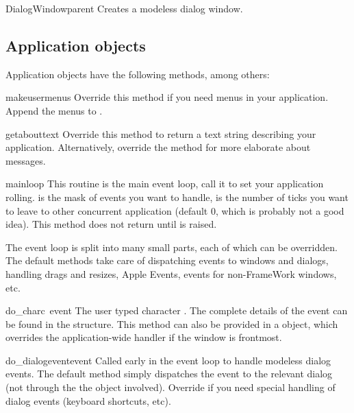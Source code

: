 \begin{funcdesc}{DialogWindow}{parent}
Creates a modeless dialog window.
\end{funcdesc}


\subsection{Application objects}
Application objects have the following methods, among others:

\renewcommand{\indexsubitem}{(Application method)}

\begin{funcdesc}{makeusermenus}{}
Override this method if you need menus in your application. Append the
menus to .
\end{funcdesc}

\begin{funcdesc}{getabouttext}{}
Override this method to return a text string describing your
application. Alternatively, override the  method for
more elaborate about messages.
\end{funcdesc}

\begin{funcdesc}{mainloop}{}
This routine is the main event loop, call it to set your application
rolling.  is the mask of events you want to handle,
 is the number of ticks you want to leave to other
concurrent application (default 0, which is probably not a good
idea). This method does not return until  is raised.

The event loop is split into many small parts, each of which can be
overridden. The default methods take care of dispatching events to
windows and dialogs, handling drags and resizes, Apple Events, events
for non-FrameWork windows, etc.
\end{funcdesc}

\begin{funcdesc}{do_char}{c\, event}
The user typed character . The complete details of the event
can be found in the  structure. This method can also be
provided in a  object, which overrides the
application-wide handler if the window is frontmost.
\end{funcdesc}

\begin{funcdesc}{do_dialogevent}{event}
Called early in the event loop to handle modeless dialog events. The
default method simply dispatches the event to the relevant dialog (not
through the the  object involved). Override if you
need special handling of dialog events (keyboard shortcuts, etc).
\end{funcdesc}

